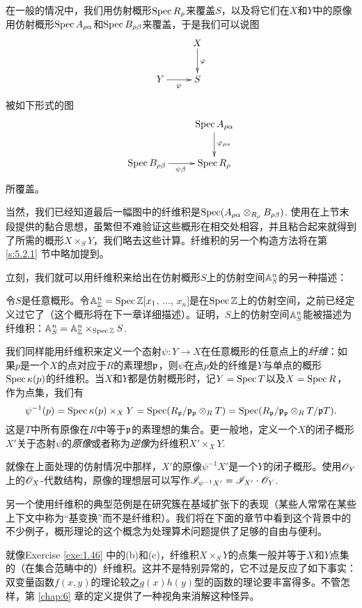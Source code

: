 在一般的情况中，我们用仿射概形$\operatorname{Spec} R_\rho$来覆盖$S$，以及将它们在$X$和$Y$中的原像用仿射概形$\operatorname{Spec} A_{\rho\alpha}$和$\operatorname{Spec} B_{\rho\beta}$来覆盖，于是我们可以说图
\[
	\xymatrix{
	&X\ar[d]^\varphi\\
	Y\ar[r]_\psi &S
	}
\]
被如下形式的图
\[
	\xymatrix{
	&\spec A_{\rho\alpha}\ar[d]^{\varphi_{\rho\alpha}}\\
	\spec B_{\rho\beta}\ar[r]_{\psi\beta} &\spec R_{\rho}
	}
\]
所覆盖。

当然，我们已经知道最后一幅图中的纤维积是$\operatorname{Spec}(A_{\rho\alpha}\otimes_{R_\rho}B_{\rho\beta})$. 使用在上节末段提供的黏合思想，虽繁但不难验证这些概形在相交处相容，并且粘合起来就得到了所需的概形$X\times_S Y$，我们略去这些计算。纤维积的另一个构造方法将在第 \ref{s:5.2.1} 节中略加提到。

立刻，我们就可以用纤维积来给出在仿射概形$S$上的仿射空间$\mathbb{A}_S^n$的另一种描述：

\begin{exe}\label{exe:1.47}
令$S$是任意概形。令$\mathbb{A}_{\mathbb{Z}}^n=\operatorname{Spec} \mathbb{Z}[x_1$, $\dots$, $x_n]$是在$\operatorname{Spec} \mathbb{Z}$上的仿射空间，之前已经定义过它了（这个概形将在下一章详细描述）。证明，$S$上的仿射空间$\mathbb{A}_S^n$能被描述为纤维积：$\mathbb{A}_S^n=\mathbb{A}_{\mathbb{Z}}^n\times_{\operatorname{Spec} \mathbb{Z}} S$.
\end{exe}

我们同样能用纤维积来定义一个态射$\psi:Y\to X$在任意概形的任意点上的\textit{纤维}：如果$p$是一个$X$的点对应于$R$的素理想$\mathfrak{p}$，则$\psi$在点$p$处的纤维是$Y$与单点的概形$\operatorname{Spec} \kappa(p)$的纤维积。当$X$和$Y$都是仿射概形时，记$Y=\operatorname{Spec} T$以及$X=\operatorname{Spec} R$，作为点集，我们有
\[
	\psi^{-1}(p)=\operatorname{Spec} \kappa(p)\times_X Y=\operatorname{Spec} (R_{\mathfrak{p}} /\mathfrak{p}_{\mathfrak{p}} \otimes_R T)=\operatorname{Spec} (R_{\mathfrak{p}}/\mathfrak{p}_{\mathfrak{p}} \otimes_R T/\mathfrak{p} T).
\]
这是$T$中所有原像在$R$中等于$\mathfrak{p}$的素理想的集合。更一般地，定义一个$X$的闭子概形$X'$关于态射$\psi$的\textit{原像}或者称为\textit{逆像}为纤维积$X'\times_X Y$.

就像在上面处理的仿射情况中那样，$X'$的原像$\psi^{-1}X'$是一个$Y$的闭子概形。使用$\mathscr{O}_Y$上的$\mathscr{O}_X$-代数结构，原像的理想层可以写作$\mathscr{I}_{\psi^{-1} X'}=\mathscr{I}_{X'}\cdot \mathscr{O}_Y$.

另一个使用纤维积的典型范例是在研究簇在基域扩张下的表现（某些人常常在某些上下文中称为“基变换”而不是纤维积）。我们将在下面的章节中看到这个背景中的不少例子，概形理论的这个概念为处理算术问题提供了足够的自由与便利。

就像Exercise \ref{exe:1.46} 中的(b)和(c)，纤维积$X\times_S Y$的点集一般并等于$X$和$Y$点集的（在集合范畴中的）纤维积。这并不是特别异常的，它不过是反应了如下事实：双变量函数$f(x,y)$的理论较之$g(x)h(y)$型的函数的理论要丰富得多。不管怎样，第 \ref{chap:6} 章的定义提供了一种视角来消解这种怪异。

